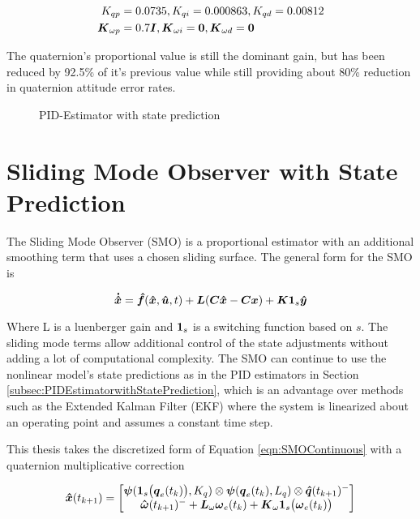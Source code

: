 \begin{equation}
  \begin{aligned}
    K_{qp} &= 0.0735, K_{qi} = 0.000863, K_{qd} = 0.00812 \\
    \boldsymbol{K}_{\omega p} &= 0.7 \boldsymbol{I}, \boldsymbol{K}_{\omega i} = \boldsymbol{0}, \boldsymbol{K}_{\omega d} = \boldsymbol{0}
  \end{aligned}
\end{equation}

The quaternion's proportional value is still the dominant gain, but has been reduced by 92.5\% of it's previous value while still providing about 80\% reduction in quaternion attitude error rates.

\begin{figure}[H]
  \centerline{}
  \caption{PID-Estimator with state prediction}
  \label{fig:PIDEstimatorwithstateprediction}
\end{figure}


\section{Sliding Mode Observer with State Prediction}
\label{sec:SlidingModeObserverwithStatePrediction}

The Sliding Mode Observer (SMO) is a proportional estimator with an additional smoothing term that uses a chosen sliding surface.  The general form for the SMO is

\begin{equation}
  \boldsymbol{\dot{\hat{x}}} = \boldsymbol{\hat{f}}(\boldsymbol{\hat{x}}, \boldsymbol{\hat{u}}, t) + \boldsymbol{L}(\boldsymbol{C}\boldsymbol{\hat{x}} - \boldsymbol{C}\boldsymbol{x}) + \boldsymbol{K}\boldsymbol{1}_s\boldsymbol{\hat{y}}
  \label{eqn:SMOContinuous}
\end{equation}

Where L is a luenberger gain and $\boldsymbol{1}_s$ is a switching function based on $s$.  The sliding mode terms allow additional control of the state adjustments without adding a lot of computational complexity.  The SMO can continue to use the nonlinear model's state predictions as in the PID estimators in Section \ref{subsec:PIDEstimatorwithStatePrediction}, which is an advantage over methods such as the Extended Kalman Filter (EKF) where the system is linearized about an operating point and assumes a constant time step.

This thesis takes the discretized form of Equation \ref{eqn:SMOContinuous} with a quaternion multiplicative correction

\begin{equation}
  \boldsymbol{\hat{x}}(t_{k+1}) = \begin{bmatrix} \boldsymbol{\psi} (\boldsymbol{1}_s\big(\boldsymbol{q}_{e}(t_k)\big), K_q) \otimes \boldsymbol{\psi}(\boldsymbol{q}_e(t_{k}), L_{q})  \otimes \boldsymbol{\hat{q}}(t_{k+1})^- \\
  \boldsymbol{\hat{\omega}}(t_{k+1})^- + \boldsymbol{L}_{\omega} \boldsymbol{\omega}_e(t_{k}) + \boldsymbol{K}_{\omega}\boldsymbol{1}_s \big(\boldsymbol{\omega}_e(t_{k}) \big) \end{bmatrix}
  \label{eqn:SMOEstimatorwithPredictionUnforcedMotion}
\end{equation}

